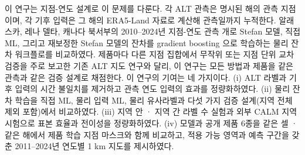 이 연구는 지점-연도 설계로 이 문제를 다룬다. 각 ALT 관측은 명시된 해의 관측 지점이며, 각 기후 입력은 그 해의 ERA5-Land 자료로 계산해 관측일까지 누적한다\cite{munozsabater2021_era5_land}. 알래스카, 레나 델타, 캐나다 북서부의 2010--2024년 지점-연도 관측 \nncyAll{}개로 Stefan 모델, 직접 ML, 그리고 재보정한 Stefan 모델의 잔차를 gradient boosting 으로 학습하는 물리 잔차 워크플로를 비교하였다. 제품마다 다른 지점 집합에서 무작위 또는 지점 단위 교차검증을 주로 보고한 기존 ALT 지도 연구\cite{Liu2024,Wei2026,Ran2022a}와 달리, 이 연구는 모든 방법과 제품을 같은 관측과 같은 검증 설계로 채점한다. 이 연구의 기여는 네 가지이다. (i) ALT 라벨과 기후 입력의 시간 불일치를 제거하고 관측 연도 입력의 효과를 정량화하였다. (ii) 물리 잔차 학습을 직접 ML, 물리 입력 ML, 물리 유사라벨과 다섯 가지 검증 설계(지역 전체 제외 포함)에서 비교하였다. (iii) 지역 안 · 지역 간 라벨 수 실험과 외부 CALM 지역 시험으로 표본 효율과 전이성을 정량화하였다. (iv) 모델과 공개 제품 6종을 같은 셀 · 같은 해에서 제품 학습 지점 마스크와 함께 비교하고, 적용 가능 영역과 예측 구간을 갖춘 2011--2024년 연도별 1 km 지도를 제시하였다.

